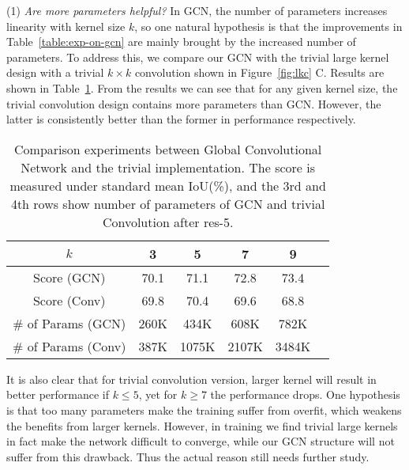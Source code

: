 \documentclass[10pt,twocolumn,letterpaper]{article}
\begin{document}
\par
	(1) \emph{Are more parameters helpful?} In GCN, the number of parameters increases linearity with kernel size $k$, so one natural hypothesis is that the improvements in Table~\ref{table:exp-on-gcn} are mainly brought by the increased number of parameters. To address this, we compare our GCN with the trivial large kernel design with a trivial $k\times k$ convolution shown in Figure~\ref{fig:lkc} C. Results are shown in Table~\ref{table:exp-on-naive}. From the results we can see that for any given kernel size, the trivial convolution design contains more parameters than GCN. However, the latter is consistently better than the former in performance respectively.  
   \begin{table}[h]
      \begin{center}
         \begin{tabular}{|c|c|c|c|c|c|}
            \hline
            $k$ & 3 & 5 & 7 & 9\\
            \hline
            Score (GCN) & 70.1 & 71.1 & 72.8 & 73.4 \\
            \hline
            Score (Conv) & 69.8 & 70.4 & 69.6 & 68.8 \\
            \hline 
            \# of Params (GCN) & 260K & 434K & 608K & 782K \\
            \hline
            \# of Params (Conv) & 387K & 1075K & 2107K & 3484K \\
            \hline
         \end{tabular}
      \end{center}
      \caption{Comparison experiments between Global Convolutional Network and the trivial implementation. The score is measured under standard mean IoU(\%), and the 3rd and 4th rows show number of parameters of GCN and trivial Convolution after res-5.}
      \label{table:exp-on-naive}
   \end{table}
	It is also clear that for trivial convolution version, larger kernel will result in better performance if $k \le 5$, yet for $k \ge 7$ the performance drops. One hypothesis is that too many parameters make the training suffer from overfit, which weakens the benefits from larger kernels. However, in training we find trivial large kernels in fact make the network difficult to converge, while our GCN structure will not suffer from this drawback. Thus the actual reason still needs further study.
\end{document}
